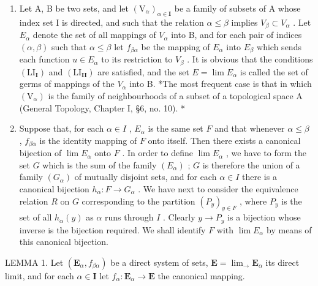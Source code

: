 \begin{enumerate}
\def\labelenumi{(\arabic{enumi})}
\item
  Let A, B be two sets, and let \((\mathrm{V}_{\alpha})_{\alpha\in\mathbf{I}}\) be a family of subsets of A whose index set I is directed, and such that the relation \(\alpha\leqslant\beta\) implies \(V_{\beta}\subset V_{\alpha}\) . Let \(E_{\alpha}\) denote the set of all mappings of \(V_{\alpha}\) into B, and for each pair of indices \((\alpha,\beta)\) such that \(\alpha\leqslant\beta\) let \(f_{\beta\alpha}\) be the mapping of \(E_{\alpha}\) into \(E_{\beta}\) which sends each function \(u\in E_{\alpha}\) to its restriction to \(V_{\beta}\) . It is obvious that the conditions \((\mathrm{LI}_{\mathbf{I}})\) and \((\mathrm{LI}_{\mathbf{II}})\) are satisfied, and the set \(E=\lim E_{\alpha}\) is called the set of germs of mappings of the \(V_{\alpha}\) into B. *The most frequent case is that in which \((\mathrm{V}_{\alpha})\) is the family of neighbourhoods of a subset of a topological space A (General Topology, Chapter I, §6, no. 10). *
\item
  Suppose that, for each \(\alpha \in I\) , \(E_{\alpha}\) is the same set \(F\) and that whenever \(\alpha \leqslant \beta\) , \(f_{\beta \alpha}\) is the identity mapping of \(F\) onto itself. Then there exists a canonical bijection of \(\lim E_{\alpha}\) onto \(F\) . In order to define \(\lim E_{\alpha}\) , we have to form the set \(G\) which is the sum of the family \((E_{\alpha})\) ; \(G\) is therefore the union of a family \((G_{\alpha})\) of mutually disjoint sets, and for each \(\alpha \in I\) there is a canonical bijection \(h_{\alpha}: F \to G_{\alpha}\) . We have next to consider the equivalence relation \(R\) on \(G\) corresponding to the partition \((P_{y})_{y \in F}\) , where \(P_{y}\) is the set of all \(h_{\alpha}(y)\) as \(\alpha\) runs through \(I\) . Clearly \(y \to P_{y}\) is a bijection whose inverse is the bijection required. We shall identify \(F\) with \(\lim E_{\alpha}\) by means of this canonical bijection.
\end{enumerate}

LEMMA 1. Let \((\mathbf{E}_{\alpha}, f_{\beta \alpha})\) be a direct system of sets, \(\mathbf{E} = \lim_{\rightarrow} \mathbf{E}_{\alpha}\) its direct limit, and for each \(\alpha \in \mathbf{I}\) let \(f_{\alpha}: \mathbf{E}_{\alpha} \to \mathbf{E}\) the canonical mapping.

